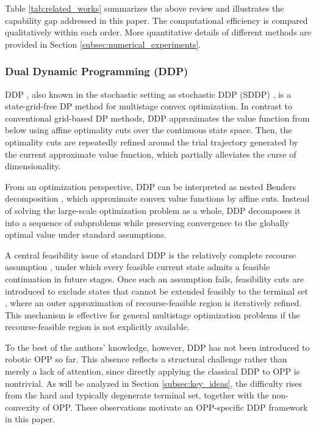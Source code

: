 \documentclass[journal]{IEEEtran}
\theoremstyle{definition}
\theoremstyle{definition}
\begin{document}
Table \ref{tab:related_works} summarizes the above review and illustrates the capability gap addressed in this paper. The computational efficiency is compared qualitatively within each order. More quantitative details of different methods are provided in Section \ref{subsec:numerical_experiments}.

\subsubsection{Dual Dynamic Programming (DDP)}\label{sub2sec:review_dpp}

DDP \cite{read1990dual}, also known in the stochastic setting as stochastic DDP (SDDP) \cite{pereira1991multi}, is a state-grid-free DP method for multistage convex optimization. In contrast to conventional grid-based DP methods, DDP approximates the value function from below using affine optimality cuts over the continuous state space. Then, the optimality cuts are repeatedly refined around the trial trajectory generated by the current approximate value function, which partially alleviates the curse of dimensionality.

From an optimization perspective, DDP can be interpreted as nested Benders decomposition \cite{bnnobrs1962partitioning,birge1985decomposition}, which approximate convex value functions by affine cuts. Instead of solving the large-scale optimization problem as a whole, DDP decomposes it into a sequence of subproblems while preserving convergence to the globally optimal value \cite{fullner2025stochastic} under standard assumptions.

A central feasibility issue of standard DDP is the relatively complete recourse assumption \cite{rockafellar1976stochastic}, under which every feasible current state admits a feasible continuation in future stages. Once such an assumption fails, feasibility cuts are introduced to exclude states that cannot be extended feasibly to the terminal set \cite{guigues2014sddp}, where an outer approximation of recourse-feasible region is iteratively refined. This mechanism is effective for general multistage optimization problems if the recourse-feasible region is not explicitly available.

To the best of the authors' knowledge, however, DDP has not been introduced to robotic OPP so far. This absence reflects a structural challenge rather than merely a lack of attention, since directly applying the classical DDP to OPP is nontrivial. As will be analyzed in Section \ref{subsec:key_ideas}, the difficulty rises from the hard and typically degenerate terminal set, together with the non-convexity of OPP. These observations motivate an OPP-specific DDP framework in this paper.
\end{document}
